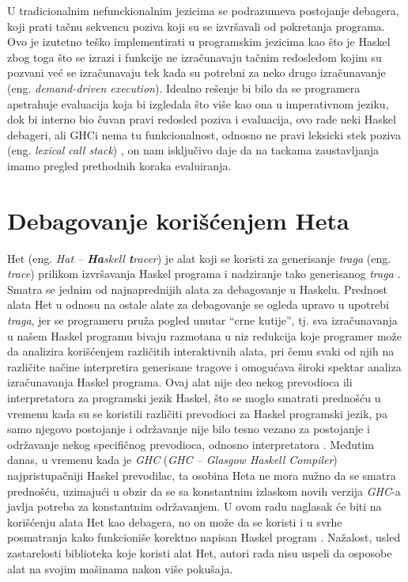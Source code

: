 \documentclass[a4paper]{article}
\begin{document}
{{U tradicionalnim nefunckionalnim jezicima se podrazumeva postojanje debagera, koji prati tačnu sekvencu poziva koji su se izvršavali od pokretanja programa. Ovo je izutetno teško implementirati u programskim jezicima kao što je Haskel zbog toga što se izrazi i funkcije ne izračunavaju tačnim redosledom kojim su pozvani već se izračunavaju tek kada su potrebni za neko drugo izračunavanje (eng. {\em demand-driven execution}). Idealno rešenje bi bilo da se programera apstrahuje evaluacija koja bi izgledala što više kao ona u imperativnom jeziku, dok bi interno bio čuvan pravi redosled poziva i evaluacija, ovo rade neki Haskel debageri, ali GHCi nema tu funkcionalnost, odnosno ne pravi leksicki stek poziva (eng. {\em lexical call stack}) , on nam isključivo daje da na tackama zaustavljanja imamo pregled prethodnih koraka evaluiranja.


\section{Debagovanje korišćenjem Heta}
Het (eng. {\em Hat -- {\bf \em Ha}skell {\bf \em t}racer}) je alat koji se koristi za generisanje {\em traga} (eng. {\em trace}) prilikom izvršavanja Haskel programa
i nadziranje tako generisanog {\em traga} \cite{chitil2002transforming}. Smatra se jednim od najnaprednijih alata za debagovanje u Haskelu. Prednost alata Het u odnosu na ostale alate za debagovanje 
se ogleda upravo u upotrebi {\em traga}, jer se programeru pruža pogled unutar ``crne kutije'', tj. sva izračunavanja u našem Haskel programu bivaju razmotana u niz redukcija koje programer može da analizira korišćenjem različitih interaktivnih alata, pri čemu svaki od njih na različite načine interpretira generisane tragove i omogućava široki spektar analiza izračunavanja Haskel programa.
Ovaj alat nije deo nekog prevodioca ili interpretatora za programski jezik Haskel,
što se moglo smatrati prednošću u vremenu kada su se koristili različiti prevodioci za Haskel programski jezik, pa samo njegovo postojanje i održavanje nije bilo tesno vezano za postojanje i održavanje nekog specifičnog prevodioca, odnosno interpretatora \cite{chitil2002transforming}. Međutim danas, u vremenu kada je {\em GHC} ({\em GHC -- Glasgow Haskell Compiler}) najpristupačniji Haskel prevodilac, ta osobina Heta ne mora nužno da se smatra prednošću, uzimajući u obzir da se sa konstantnim izlaskom novih verzija {\em GHC}-a javlja potreba za konstantnim održavanjem.
U ovom radu naglasak će biti na korišćenju alata Het kao debagera, no on može da se koristi i u svrhe posmatranja kako funkcioniše korektno napisan Haskel program \cite{wallace2001multiple}.
Nažalost, usled zastarelosti biblioteka koje koristi alat Het, autori rada nisu uspeli da osposobe alat na svojim mašinama nakon više pokušaja. 

}}
\end{document}
